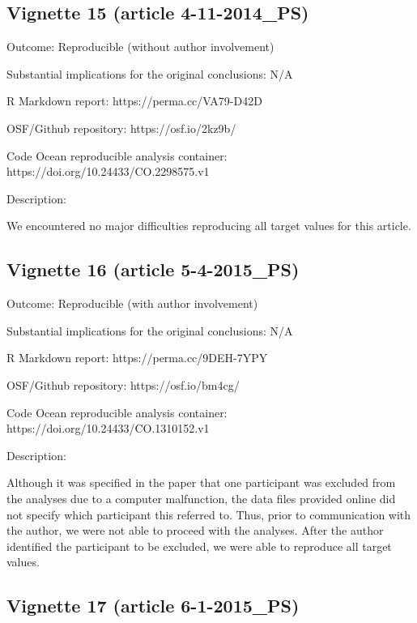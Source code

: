 \documentclass[english,,man,floatsintext]{apa6}
\begin{document}
\begin{appendix}
\hypertarget{vignette-15-article-4-11-2014_ps}{%
\subsection{Vignette 15 (article
4-11-2014\_PS)}\label{vignette-15-article-4-11-2014_ps}}

Outcome: Reproducible (without author involvement)

Substantial implications for the original conclusions: N/A

R Markdown report: https://perma.cc/VA79-D42D

OSF/Github repository: https://osf.io/2kz9b/

Code Ocean reproducible analysis container:
https://doi.org/10.24433/CO.2298575.v1

Description:

We encountered no major difficulties reproducing all target values for
this article.

\hypertarget{vignette-16-article-5-4-2015_ps}{%
\subsection{Vignette 16 (article
5-4-2015\_PS)}\label{vignette-16-article-5-4-2015_ps}}

Outcome: Reproducible (with author involvement)

Substantial implications for the original conclusions: N/A

R Markdown report: https://perma.cc/9DEH-7YPY

OSF/Github repository: https://osf.io/bm4cg/

Code Ocean reproducible analysis container:
https://doi.org/10.24433/CO.1310152.v1

Description:

Although it was specified in the paper that one participant was excluded
from the analyses due to a computer malfunction, the data files provided
online did not specify which participant this referred to. Thus, prior
to communication with the author, we were not able to proceed with the
analyses. After the author identified the participant to be excluded, we
were able to reproduce all target values.

\hypertarget{vignette-17-article-6-1-2015_ps}{%
\subsection{Vignette 17 (article
6-1-2015\_PS)}\label{vignette-17-article-6-1-2015_ps}}


\end{appendix}
\end{document}
